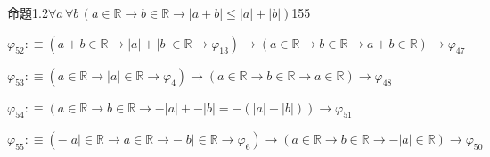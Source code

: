 \begin{fullproof}{命題1.2}{$\forall a\,\forall b\,(a \in \mathbb{R} \to b \in \mathbb{R} \to \lvert a + b \rvert \leq \lvert a \rvert + \lvert b \rvert)$}{155}
\begin{abbrevlist}
\item $\varphi_{52} :\equiv (a + b \in \mathbb{R} \to \lvert a \rvert + \lvert b \rvert \in \mathbb{R} \to \varphi_{13}) \to (a \in \mathbb{R} \to b \in \mathbb{R} \to a + b \in \mathbb{R}) \to \varphi_{47}$
\item $\varphi_{53} :\equiv (a \in \mathbb{R} \to \lvert a \rvert \in \mathbb{R} \to \varphi_{4}) \to (a \in \mathbb{R} \to b \in \mathbb{R} \to a \in \mathbb{R}) \to \varphi_{48}$
\item $\varphi_{54} :\equiv (a \in \mathbb{R} \to b \in \mathbb{R} \to -\lvert a \rvert + -\lvert b \rvert = -(\lvert a \rvert + \lvert b \rvert)) \to \varphi_{51}$
\item $\varphi_{55} :\equiv (-\lvert a \rvert \in \mathbb{R} \to a \in \mathbb{R} \to -\lvert b \rvert \in \mathbb{R} \to \varphi_{6}) \to (a \in \mathbb{R} \to b \in \mathbb{R} \to -\lvert a \rvert \in \mathbb{R}) \to \varphi_{50}$
\end{abbrevlist}
\end{fullproof}

